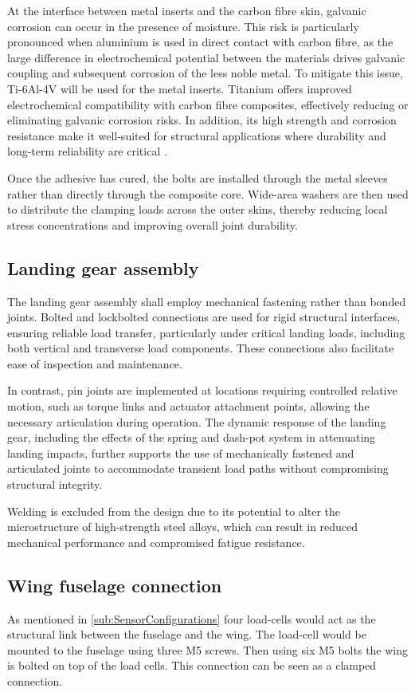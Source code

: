 At the interface between metal inserts and the carbon fibre skin, galvanic corrosion can occur in the presence of moisture. This risk is particularly pronounced when aluminium is used in direct contact with carbon fibre, as the large difference in electrochemical potential between the materials drives galvanic coupling and subsequent corrosion of the less noble metal. To mitigate this issue, Ti-6Al-4V will be used for the metal inserts. Titanium offers improved electrochemical compatibility with carbon fibre composites, effectively reducing or eliminating galvanic corrosion risks. In addition, its high strength and corrosion resistance make it well-suited for structural applications where durability and long-term reliability are critical \cite{Melhem2019}.

Once the adhesive has cured, the bolts are installed through the metal sleeves rather than directly through the composite core. Wide-area washers are then used to distribute the clamping loads across the outer skins, thereby reducing local stress concentrations and improving overall joint durability.

\subsection{Landing gear assembly}
\label{sub:lg_assembly}

The landing gear assembly shall employ mechanical fastening rather than bonded joints. Bolted and lockbolted connections are used for rigid structural interfaces, ensuring reliable load transfer, particularly under critical landing loads, including both vertical and transverse load components. These connections also facilitate ease of inspection and maintenance.

In contrast, pin joints are implemented at locations requiring controlled relative motion, such as torque links and actuator attachment points, allowing the necessary articulation during operation. The dynamic response of the landing gear, including the effects of the spring and dash-pot system in attenuating landing impacts, further supports the use of mechanically fastened and articulated joints to accommodate transient load paths without compromising structural integrity.

Welding is excluded from the design due to its potential to alter the microstructure of high-strength steel alloys, which can result in reduced mechanical performance and compromised fatigue resistance.


\subsection{Wing fuselage connection}
\label{sub:lWingfuselageconnection} As mentioned in \autoref{sub:SensorConfigurations} four load-cells would act as the structural link between the fuselage and the wing. The load-cell would be mounted to the fuselage using three M5 screws. Then using six M5 bolts the wing is bolted on top of the load cells. This connection can be seen as a clamped connection. 


